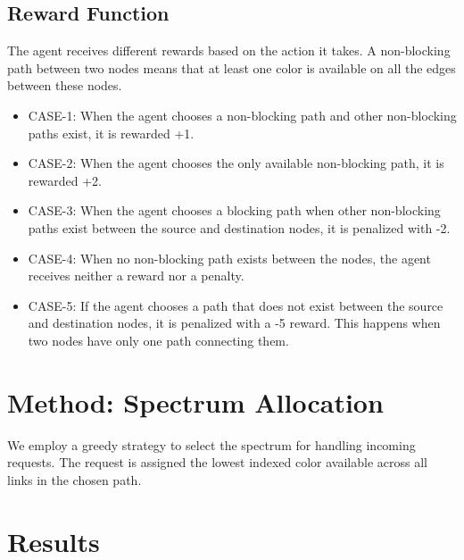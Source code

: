 \documentclass[conference]{IEEEtran}
\begin{document}
\subsection{Reward Function}
\vspace{0.5em}
The agent receives different rewards based on the action it takes. A non-blocking path between two nodes means that at least one color is available on all the edges between these nodes.
\begin{itemize}
    \item CASE-1: When the agent chooses a non-blocking path and other non-blocking paths exist, it is rewarded +1.
    \item CASE-2: When the agent chooses the only available non-blocking path, it is rewarded +2.
    \item CASE-3: When the agent chooses a blocking path when other non-blocking paths exist between the source and destination nodes, it is penalized with -2.
    \item CASE-4: When no non-blocking path exists between the nodes, the agent receives neither a reward nor a penalty.
    \item CASE-5: If the agent chooses a path that does not exist between the source and destination nodes, it is penalized with a -5 reward. This happens when two nodes have only one path connecting them.
\end{itemize}
 

\section{Method: Spectrum Allocation}
\vspace{0.5em}

We employ a greedy strategy to select the spectrum for handling incoming requests. The request is assigned the lowest indexed color available across all links in the chosen path.

\section{Results}
\vspace{0.5em}
\end{document}
